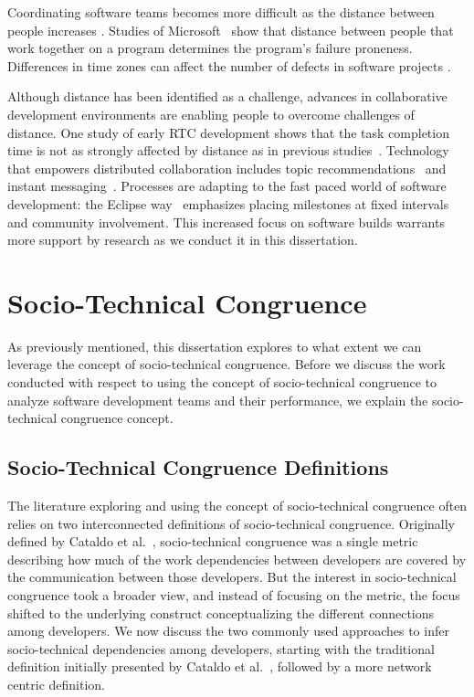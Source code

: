 Coordinating software teams becomes more difficult as the distance between people increases \cite{herbsleb:icse:2001}.
Studies of Microsoft~\cite{bird2009:dds_quality,nagappan:icse:2008}
show that distance between people that work together on a
program determines the program's failure proneness.
Differences in time zones can affect the number of defects in software projects \cite{cataldo2009:quality}.

Although distance has been identified as a challenge, advances in collaborative
development environments are enabling people to overcome challenges of distance.
One study of early RTC development
shows that the task completion time is not as strongly affected by distance as in previous studies~\cite{Nguyen:2008Distance}. Technology that empowers distributed collaboration includes topic recommendations~\cite{carter2004} and instant messaging~\cite{niinimaki2008}. Processes are adapting to the fast paced world of software development: the Eclipse way~\cite{frost:ieeesoftware:2007} emphasizes placing milestones at fixed intervals and community involvement.
This increased focus on software builds  warrants more support by research as we conduct it in this dissertation.




\section{Socio-Technical Congruence}
As previously mentioned, this dissertation explores to what extent we can leverage the concept of socio-technical congruence. 
Before we discuss the work conducted with respect to using the concept of socio-technical congruence to analyze software development teams and their performance, we explain the socio-technical congruence concept.

\subsection{Socio-Technical Congruence Definitions}
The literature exploring and using the concept of socio-technical congruence often relies on two interconnected definitions of socio-technical congruence.
Originally defined by Cataldo et al.~\cite{cataldo:cscw:2006}, socio-technical congruence was a single metric describing how much of the work dependencies between developers are covered by the communication between those developers.
But the interest in socio-technical congruence took a broader view, and instead of focusing on the metric, the focus shifted to the underlying construct conceptualizing the different connections among developers.
We now discuss the two commonly used approaches to infer socio-technical dependencies among developers, starting with the traditional definition initially presented by Cataldo et al.~\cite{cataldo:cscw:2006}, followed by a more network centric definition.

